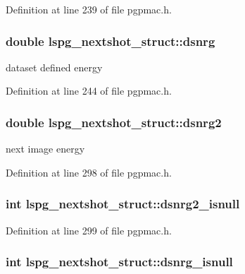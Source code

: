 Definition at line 239 of file pgpmac.\-h.

\hypertarget{structlspg__nextshot__struct_a371e574055fec7660b8f2e637eaf9f25}{
\subsubsection[{dsnrg}]{\setlength{\rightskip}{0pt plus 5cm}double lspg\-\_\-nextshot\-\_\-struct\-::dsnrg}}\label{structlspg__nextshot__struct_a371e574055fec7660b8f2e637eaf9f25}


dataset defined energy 



Definition at line 244 of file pgpmac.\-h.

\hypertarget{structlspg__nextshot__struct_ae461439c2af31255227765c0fb61850f}{
\subsubsection[{dsnrg2}]{\setlength{\rightskip}{0pt plus 5cm}double lspg\-\_\-nextshot\-\_\-struct\-::dsnrg2}}\label{structlspg__nextshot__struct_ae461439c2af31255227765c0fb61850f}


next image energy 



Definition at line 298 of file pgpmac.\-h.

\hypertarget{structlspg__nextshot__struct_aee9f8196dd9bcea832a60f2f0ea3a999}{
\subsubsection[{dsnrg2\-\_\-isnull}]{\setlength{\rightskip}{0pt plus 5cm}int lspg\-\_\-nextshot\-\_\-struct\-::dsnrg2\-\_\-isnull}}\label{structlspg__nextshot__struct_aee9f8196dd9bcea832a60f2f0ea3a999}


Definition at line 299 of file pgpmac.\-h.

\hypertarget{structlspg__nextshot__struct_ad14d8bb50290ec12e58f4aaec5cc5aab}{
\subsubsection[{dsnrg\-\_\-isnull}]{\setlength{\rightskip}{0pt plus 5cm}int lspg\-\_\-nextshot\-\_\-struct\-::dsnrg\-\_\-isnull}}\label{structlspg__nextshot__struct_ad14d8bb50290ec12e58f4aaec5cc5aab}


